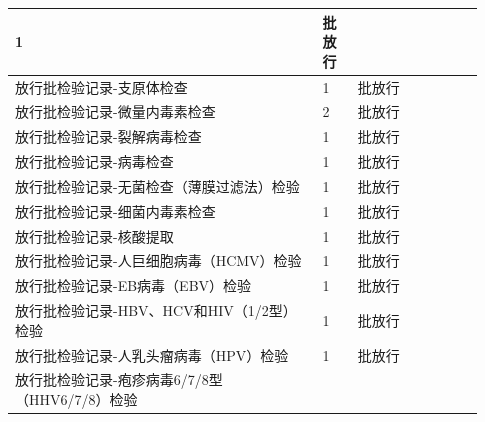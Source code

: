 \documentclass[UTF8,10pt,a4paper,fontset=fandol]{ctexart}
\newcommand{\fieldvalue}[1]{#1}
\begin{document}
\begin{center}
\begin{tabular}{|p{0.61\linewidth}|p{0.07\linewidth}|p{0.25\linewidth}|}
\fieldvalue{1} &
\fieldvalue{批放行} \\ \hline
放行批检验记录-支原体检查 &
\fieldvalue{1} &
\fieldvalue{批放行} \\ \hline
放行批检验记录-微量内毒素检查 &
\fieldvalue{2} &
\fieldvalue{批放行} \\ \hline
放行批检验记录-裂解病毒检查 &
\fieldvalue{1} &
\fieldvalue{批放行} \\ \hline
放行批检验记录-病毒检查 &
\fieldvalue{1} &
\fieldvalue{批放行} \\ \hline
放行批检验记录-无菌检查（薄膜过滤法）检验 &
\fieldvalue{1} &
\fieldvalue{批放行} \\ \hline
放行批检验记录-细菌内毒素检查 &
\fieldvalue{1} &
\fieldvalue{批放行} \\ \hline
放行批检验记录-核酸提取 &
\fieldvalue{1} &
\fieldvalue{批放行} \\ \hline
放行批检验记录-人巨细胞病毒（HCMV）检验 &
\fieldvalue{1} &
\fieldvalue{批放行} \\ \hline
放行批检验记录-EB病毒（EBV）检验 &
\fieldvalue{1} &
\fieldvalue{批放行} \\ \hline
放行批检验记录-HBV、HCV和HIV（1/2型）检验 &
\fieldvalue{1} &
\fieldvalue{批放行} \\ \hline
放行批检验记录-人乳头瘤病毒（HPV）检验 &
\fieldvalue{1} &
\fieldvalue{批放行} \\ \hline
放行批检验记录-疱疹病毒6/7/8型（HHV6/7/8）检验 &

\end{tabular}
\end{center}
\end{document}
